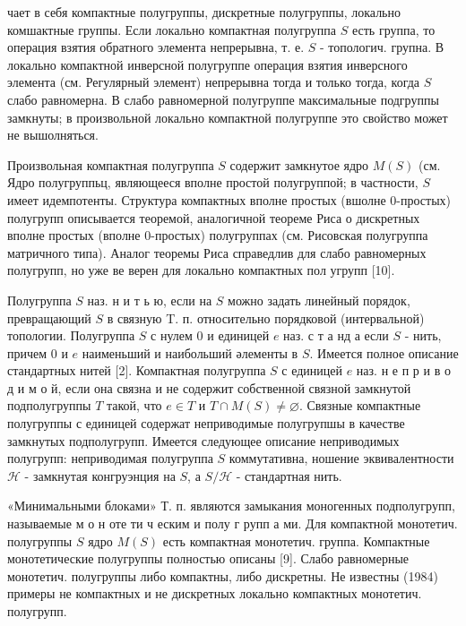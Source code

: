 \documentclass[10pt]{article}
\begin{document}
чает в себя компактные полугруппы, дискретные полугруппы, локально комшактные группы. Если локально компактная полугруппа $S$ есть группа, то операция взятия обратного элемента непрерывна, т. е. $S$ - топологич. групна. В локально компактной инверсной полугруппе операция взятия инверсного элемента (см. Регулярный элемент) непрерывна тогда и только тогда, когда $S$ слабо равномерна. В слабо равномерной полугруппе максимальные подгруппы замкнуты; в произвольной локально компактной полугруппе это свойство может не вышолняться.



Произвольная компактная полугруппа $S$ содержит замкнутое ядро $M(S)$ (см. Ядро полугруппьц, являющееся вполне простой полугруппой; в частности, $S$ имеет идемпотенты. Структура компактных вполне простых (вшолне 0-простых) полугрупп описывается теоремой, аналогичной теореме Риса о дискретных вполне простых (вполне 0-простых) полугруппах (см. Рисовская полугруппа матричного типа). Аналог теоремы Риса справедлив для слабо равномерных полугрупп, но уже ве верен для локально компактных пол угрупп [10].



Полугруппа $S$ наз. н и т ь ю, если на $S$ можно задать линейный порядок, превращающий $S$ в связную T. п. относительно порядковой (интервальной) топологии. Полугруппа $S$ с нулем 0 и единицей $e$ наз. с т а нд а если $S$ - нить, причем 0 и $e$ наименьший и наибольший әлементы в $S$. Имеется полное описание стандартных нитей [2]. Компактная полугруппа $S$ с единицей $e$ наз. н е п р и в о д и м о й, если она связна и не содержит собственной связной замкнутой подполугруппы $T$ такой, что $e \in T$ и $T \cap M(S) \neq \varnothing$. Связные компактные полугруппы с единицей содержат неприводимые полугрупшы в качестве замкнутых подполугрупп. Имеется следующее описание неприводимых полугрупп: неприводимая полугруппа $S$ коммутативна, ношение эквивалентности $\mathscr{H}$ - замкнутая конгруэнция на $S$, а $S / \mathscr{H}$ - стандартная нить.



«Минимальными блоками» Т. п. являются замыкания моногенных подполугрупп, называемые м о н оте ти ч еским и полу г рупп а ми. Для компактной монотетич. полугруппы $S$ ядро $M(S)$ есть компактная монотетич. группа. Компактные монотетические полугруппы полностью описаны [9]. Слабо равномерные монотетич. полугруппы либо компактны, либо дискретны. Не известны (1984) примеры не компактных и не дискретных локально компактных монотетич. полугрупп.
\end{document}

